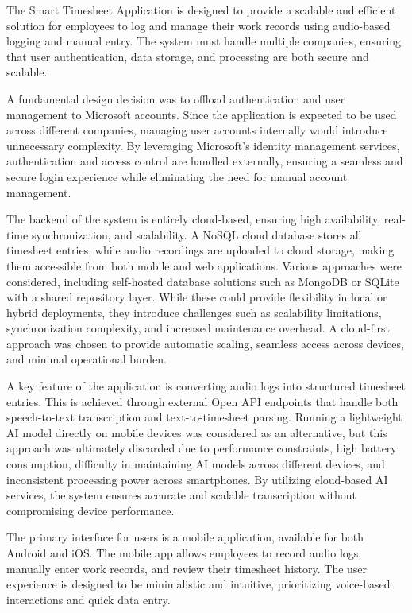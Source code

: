 \documentclass[
  digital,     %
  oneside,     %
  nosansbold,  %
  nocolorbold, %
  lof,         %
  lot,         %
]{fithesis4}
\begin{document}
The Smart Timesheet Application is designed to provide a scalable and efficient solution for employees to log and manage their work records using audio-based logging and manual entry. The system must handle multiple companies, ensuring that user authentication, data storage, and processing are both secure and scalable.

A fundamental design decision was to offload authentication and user management to Microsoft accounts. Since the application is expected to be used across different companies, managing user accounts internally would introduce unnecessary complexity. By leveraging Microsoft's identity management services, authentication and access control are handled externally, ensuring a seamless and secure login experience while eliminating the need for manual account management.

The backend of the system is entirely cloud-based, ensuring high availability, real-time synchronization, and scalability. A NoSQL cloud database stores all timesheet entries, while audio recordings are uploaded to cloud storage, making them accessible from both mobile and web applications. Various approaches were considered, including self-hosted database solutions such as MongoDB or SQLite with a shared repository layer. While these could provide flexibility in local or hybrid deployments, they introduce challenges such as scalability limitations, synchronization complexity, and increased maintenance overhead. A cloud-first approach was chosen to provide automatic scaling, seamless access across devices, and minimal operational burden.

A key feature of the application is converting audio logs into structured timesheet entries. This is achieved through external Open API endpoints that handle both speech-to-text transcription and text-to-timesheet parsing. Running a lightweight AI model directly on mobile devices was considered as an alternative, but this approach was ultimately discarded due to performance constraints, high battery consumption, difficulty in maintaining AI models across different devices, and inconsistent processing power across smartphones. By utilizing cloud-based AI services, the system ensures accurate and scalable transcription without compromising device performance.

The primary interface for users is a mobile application, available for both Android and iOS. The mobile app allows employees to record audio logs, manually enter work records, and review their timesheet history. The user experience is designed to be minimalistic and intuitive, prioritizing voice-based interactions and quick data entry.
\end{document}

